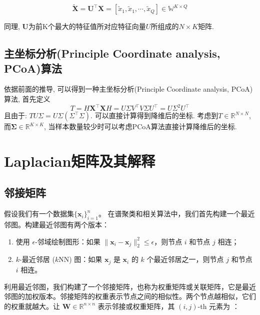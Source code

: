 \documentclass[lang=cn,10pt]{gorgeousnbook}
\numberwithin{equation}{section}%
\numberwithin{figure}{section}%
\begin{document}
\begin{equation}
\mathbf{\tilde{X}}=\mathbf{U}^{\top}\mathbf{X}=\left[ \tilde{x}_1,\tilde{x}_1,\cdots ,\tilde{x}_Q \right] \in \mathbb{W}^{K\times Q}
\end{equation}

同理, $\mathbf{U}$为前K个最大的特征值所对应特征向量$U$所组成的$N\times K$矩阵.
\subsection{主坐标分析(Principle Coordinate analysis, PCoA)算法}
依据前面的推导, 可以得到一种主坐标分析(Principle Coordinate analysis, PCoA)算法, 首先定义
\begin{equation}
T=H\mathbf{X}^{\top}\mathbf{X}H=U\varSigma V^{\top}V\varSigma U^{\top}=U\varSigma ^2U^\top 
\end{equation}
且由于: $TU\varSigma =U\varSigma \left( \varSigma ^{\top}\varSigma \right) $. 可以直接计算得到降维后的坐标. 考虑到$T\in \mathbb{R}^{N\times N}$, 而$\mathbf{\Sigma}\in \mathbb{R}^{K\times K}$, 当样本数量较少时可以考虑PCoA算法直接计算降维后的坐标. 
\section{Laplacian矩阵及其解释}\label{section_interpretation_Laplacian}
\subsection{邻接矩阵}
假设我们有一个数据集$\{\boldsymbol{x}_i\}_{i=1}^n$。
在谱聚类和相关算法中，我们首先构建一个最近邻图。构建最近邻图有两个版本：

\begin{enumerate}
\item 使用 $\epsilon$-邻域绘制图形：如果 $\|\boldsymbol{x}_i - \boldsymbol{x}_j\|_2^2 \leq \epsilon$，则节点 $i$ 和节点 $j$ 相连；
\item $k$-最近邻居 ($k$NN) 图：如果 $\boldsymbol{x}_j$ 是 $\boldsymbol{x}_i$ 的 $k$ 个最近邻居之一，则节点 $j$ 和节点 $i$ 相连。
\end{enumerate}
利用最近邻图，我们构建了一个邻接矩阵，也称为权重矩阵或关联矩阵，它是最近邻图的加权版本。邻接矩阵的权重表示节点之间的相似性。两个节点越相似，它们的权重就越大。让 $\boldsymbol{W} \in \mathbb{R}^{n \times n}$ 表示邻接或权重矩阵，其 $(i,j)$-th 元素为 \cite{ng2001spectral}：
\end{document}
